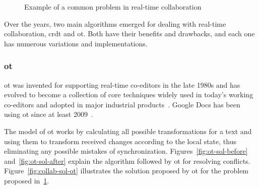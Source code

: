 \begin{figure}[H]
  \centerfloat
  \sffamily

  \caption{Example of a common problem in real-time collaboration}
  \label{fig:collab-problem}
\end{figure}

Over the years, two main algorithms emerged for dealing with real-time collaboration, \acrfull{crdt} and \acrfull{ot}.
Both have their benefits and drawbacks, and each one has numerous variations and implementations.

\subsubsection{\acrfull{ot}}

\acrlong{ot} was invented for supporting real-time co-editors in the late 1980s and has evolved to become a collection of core techniques widely used in today's working co-editors and adopted in major industrial products~\autocite{sun_real_2020}.
Google Docs has been using \acrshort{ot} since at least 2009~\autocite{noauthor_whats_nodate}.

The model of \acrlong{ot} works by calculating all possible transformations for a text and using them to transform received changes according to the local state, thus eliminating any possible mistakes of synchronization.
Figures~\ref{fig:ot-sol-before} and~\ref{fig:ot-sol-after} explain the algorithm followed by \acrshort{ot} for resolving conflicts.
Figure~\ref{fig:collab-sol-ot} illustrates the solution proposed by \acrshort{ot} for the problem proposed in~\ref{fig:collab-problem}.


